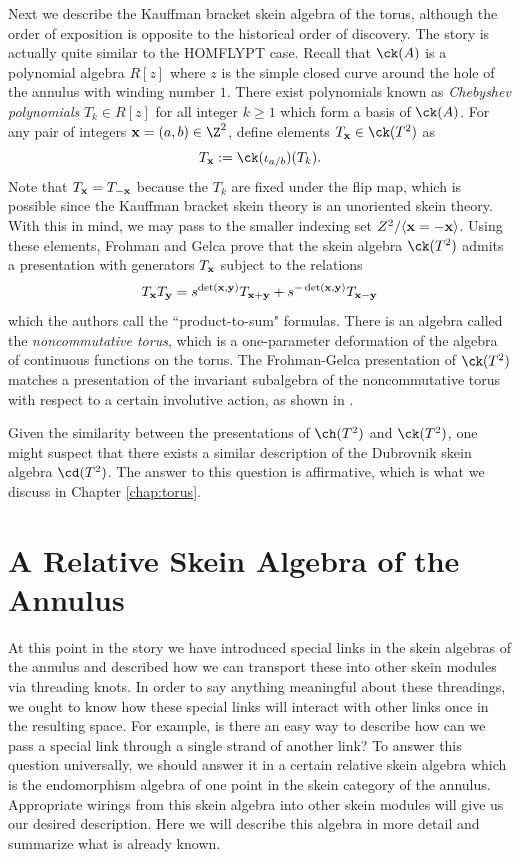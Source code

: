 Next we describe the Kauffman bracket skein algebra of the torus, although the order of exposition is opposite to the historical order of discovery. The story is actually quite similar to the HOMFLYPT case. Recall that $\ck(A)$ is a polynomial algebra $R[z]$ where $z$ is the simple closed curve around the hole of the annulus with winding number $1$. There exist polynomials known as \textit{Chebyshev polynomials} $T_k \in R[z]$ for all integer $k \geq 1$ which form a basis of $\ck(A)$. For any pair of integers $\xx = (a, b) \in \Z^2$, define elements $T_\xx \in \ck(T^2)$ as 
\[
T_\xx := \ck(\iota_{a/b})(T_k).
\]
Note that $T_{\mathbf{x}} = T_{-{\mathbf{x}}}$ because the $T_k$ are fixed under the flip map, which is possible since the Kauffman bracket skein theory is an unoriented skein theory. With this in mind, we may pass to the smaller indexing set $Z^2 / \langle {\mathbf{x}} = -{\mathbf{x}} \rangle$. Using these elements, Frohman and Gelca  prove that the skein algebra $\ck(T^2)$ admits a presentation with generators $T_{\mathbf{x}}$ subject to the relations
\[
T_{\mathbf{x}} T_{\mathbf{y}} = s^{\det({\mathbf{x}}, {\mathbf{y}})} T_{{\mathbf{x}} + {\mathbf{y}}} + s^{-\det({\mathbf{x}}, {\mathbf{y}})} T_{{\mathbf{x}} - {\mathbf{y}}}
\]
which the authors call the ``product-to-sum" formulas. There is an algebra called the \textit{noncommutative torus}, which is a one-parameter deformation of the algebra of continuous functions on the torus. The Frohman-Gelca presentation of $\ck(T^2)$ matches a presentation of the invariant subalgebra of the noncommutative torus with respect to a certain involutive action, as shown in . 

Given the similarity between the presentations of $\ch(T^2)$ and $\ck(T^2)$, one might suspect that there exists a similar description of the Dubrovnik skein algebra $\cd(T^2)$. The answer to this question is affirmative, which is what we discuss in Chapter \ref{chap:torus}.


\section{A Relative Skein Algebra of the Annulus} \label{sec:relativeannulus}

At this point in the story we have introduced special links in the skein algebras of the annulus and described how we can transport these into other skein modules via threading knots. In order to say anything meaningful about these threadings, we ought to know how these special links will interact with other links once in the resulting space. For example, is there an easy way to describe how can we pass a special link through a single strand of another link? To answer this question universally, we should answer it in a certain relative skein algebra which is the endomorphism algebra of one point in the skein category of the annulus. Appropriate wirings from this skein algebra into other skein modules will give us our desired description. Here we will describe this algebra in more detail and summarize what is already known. 

